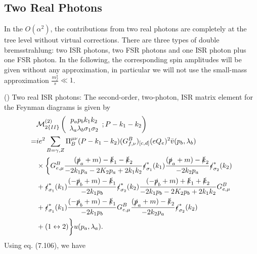 \subsection{Two Real Photons}

In the $O(\alpha^2)$, the contributions from two real photons are completely at the tree level without virtual corrections. There are three types of double bremsstrahlung: two ISR photons, two FSR photons and one ISR photon plus one FSR photon. In the following, the corresponding spin amplitudes will be given without any approximation, in particular we will not use the small-mass approximation $\frac{m_f^2}{s}\ll 1$.

() Two real ISR photons:
The second-order, two-photon, ISR matrix element for the Feynman diagrams is given by
\begin{align}
&\mathcal{M}^{(2)}_{2\{II\}}\left(\begin{array}{c}
p_ap_bk_1k_2\\\lambda_a\lambda_b\sigma_1\sigma_2
\end{array};P-k_1-k_2\right)\nonumber\\
=&ie^2\sum_{B=\gamma,Z}\Pi_B^{\mu\nu}(P-k_1-k_2)(G^B_{f,\nu})_{[c,d]}(eQ_e)^2\bar{v}(p_b,\lambda_b)\nonumber\\
&\times\biggl\{ G^B_{e,\mu}\frac{(\slashed p_a+m)-\slashed k_1-\slashed k_2}{-2k_1p_a-2K_2p_a+2k_1k_2}\slashed \epsilon^\ast_{\sigma_1}(k_1) \frac{(\slashed p_a+m)-\slashed k_2}{-2k_2p_a}\slashed\epsilon^\ast_{\sigma_2}(k_2)\nonumber\\
&+ \slashed \epsilon^\ast_{\sigma_1}(k_1)\frac{(-\slashed p_b+m)-\slashed k_1}{-2k_1p_b}\slashed\epsilon^\ast_{\sigma_2}(k_2)\frac{(-\slashed p_b+m)+\slashed k_1+\slashed k_2}{-2k_1p_b-2K_2p_b+2k_1k_2} G^B_{e,\mu}\nonumber\\
&+ \slashed \epsilon^\ast_{\sigma_1}(k_1)\frac{(-\slashed p_b+m)-\slashed k_1}{-2k_1p_b}G^B_{e,\mu}\frac{(\slashed p_a+m)-\slashed k_2}{-2k_2p_a} \slashed\epsilon^\ast_{\sigma_2}(k_2)\nonumber\\
&+(1\leftrightarrow 2)\biggr\}u(p_a,\lambda_a).
\end{align}
Using eq. (7.106), we have
